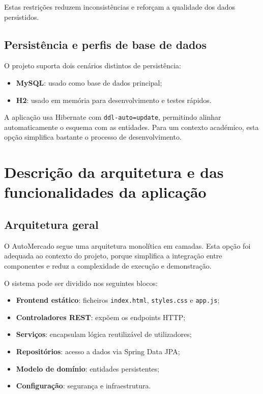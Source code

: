 \documentclass[10pt,a4paper]{report}
\begin{document}
Estas restrições reduzem inconsistências e reforçam a qualidade dos dados persistidos.

\section{Persistência e perfis de base de dados}

O projeto suporta dois cenários distintos de persistência:

\begin{itemize}
    \item \textbf{MySQL}: usado como base de dados principal;
    \item \textbf{H2}: usado em memória para desenvolvimento e testes rápidos.
\end{itemize}

A aplicação usa Hibernate com \texttt{ddl-auto=update}, permitindo alinhar automaticamente o esquema com as entidades. Para um contexto académico, esta opção simplifica bastante o processo de desenvolvimento.

\chapter{Descrição da arquitetura e das funcionalidades da aplicação}
\label{chap:arquitetura}

\section{Arquitetura geral}

O AutoMercado segue uma arquitetura monolítica em camadas. Esta opção foi adequada ao contexto do projeto, porque simplifica a integração entre componentes e reduz a complexidade de execução e demonstração.

O sistema pode ser dividido nos seguintes blocos:

\begin{itemize}
    \item \textbf{Frontend estático}: ficheiros \texttt{index.html}, \texttt{styles.css} e \texttt{app.js};
    \item \textbf{Controladores REST}: expõem os endpoints HTTP;
    \item \textbf{Serviços}: encapsulam lógica reutilizável de utilizadores;
    \item \textbf{Repositórios}: acesso a dados via Spring Data JPA;
    \item \textbf{Modelo de domínio}: entidades persistentes;
    \item \textbf{Configuração}: segurança e infraestrutura.
\end{itemize}
\end{document}
